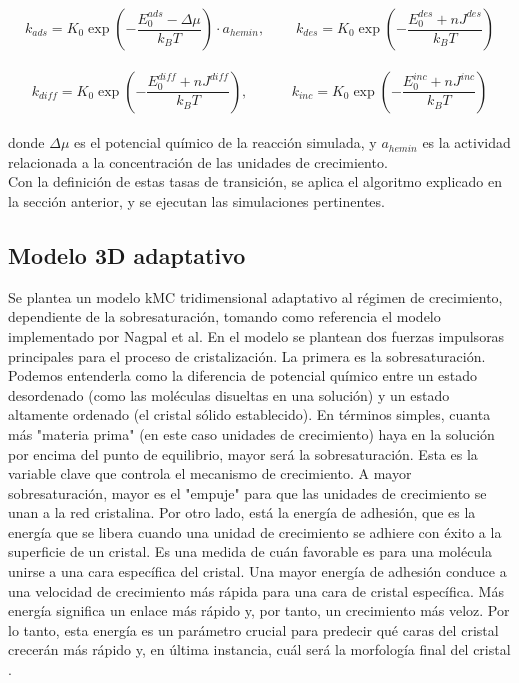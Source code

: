 \documentclass[12pt,letterpaper,oneside]{report}
\begin{document}
$$k_{ads} = K_0\exp{\left(-\frac{E_0^{ads} - \Delta\mu}{k_BT}\right)}\cdot a_{hemin}, ~~~~~~~~~~ k_{des} = K_0\exp{\left(-\frac{E_0^{des} + nJ^{des}}{k_BT}\right)}$$\\


$$k_{diff} = K_0\exp{\left(-\frac{E_0^{diff} + nJ^{diff}}{k_BT}\right)}, ~~~~~~~~~~~~~~ k_{inc} = K_0\exp{\left(-\frac{E_0^{inc} + nJ^{inc}}{k_BT}\right)}$$\\

\noindent donde $\Delta\mu$ es el potencial químico de la reacción simulada, y $a_{hemin}$ es la actividad relacionada a la concentración de las unidades de crecimiento.\\

Con la definición de estas tasas de transición, se aplica el algoritmo explicado en la sección anterior, y se ejecutan las simulaciones pertinentes.\\

\subsection{Modelo 3D adaptativo}

Se plantea un modelo kMC tridimensional adaptativo al régimen de crecimiento, dependiente de la sobresaturación, tomando como referencia el modelo implementado por Nagpal et al. En el modelo se plantean dos fuerzas impulsoras principales para el proceso de cristalización. La primera es la sobresaturación. Podemos entenderla como la diferencia de potencial químico entre un estado desordenado (como las moléculas disueltas en una solución) y un estado altamente ordenado (el cristal sólido establecido). En términos simples, cuanta más "materia prima" (en este caso unidades de crecimiento) haya en la solución por encima del punto de equilibrio, mayor será la sobresaturación. Esta es la variable clave que controla el mecanismo de crecimiento. A mayor sobresaturación, mayor es el "empuje" para que las unidades de crecimiento se unan a la red cristalina. Por otro lado, está la energía de adhesión, que es la energía que se libera cuando una unidad de crecimiento se adhiere con éxito a la superficie de un cristal. Es una medida de cuán favorable es para una molécula unirse a una cara específica del cristal. Una mayor energía de adhesión conduce a una velocidad de crecimiento más rápida para una cara de cristal específica. Más energía significa un enlace más rápido y, por tanto, un crecimiento más veloz. Por lo tanto, esta energía es un parámetro crucial para predecir qué caras del cristal crecerán más rápido y, en última instancia, cuál será la morfología final del cristal \cite{Nagpal2024}.\\
\end{document}
